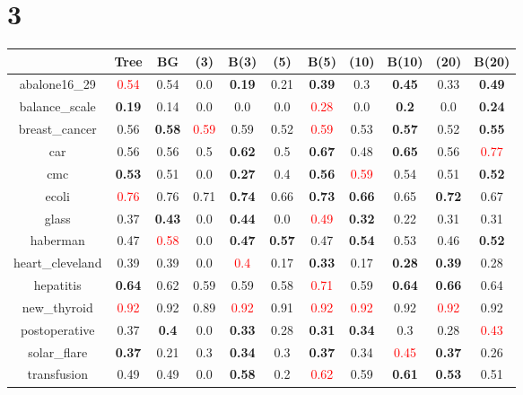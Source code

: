 \documentclass{article}%
\begin{document}
\section*{3}%
\begin{tabular}{c|cccccccccc}%
\hline%
&Tree&BG&(3)&B(3)&(5)&B(5)&(10)&B(10)&(20)&B(20)\\%
\hline%
abalone16\_29&\textcolor{red}{ 
0.54
}&0.54&0.0&\textbf{0.19}&0.21&\textbf{0.39}&0.3&\textbf{0.45}&0.33&\textbf{0.49}\\%
\hline%
balance\_scale&\textbf{0.19}&0.14&0.0&0.0&0.0&\textcolor{red}{ 
0.28
}&0.0&\textbf{0.2}&0.0&\textbf{0.24}\\%
\hline%
breast\_cancer&0.56&\textbf{0.58}&\textcolor{red}{ 
0.59
}&0.59&0.52&\textcolor{red}{ 
0.59
}&0.53&\textbf{0.57}&0.52&\textbf{0.55}\\%
\hline%
car&0.56&0.56&0.5&\textbf{0.62}&0.5&\textbf{0.67}&0.48&\textbf{0.65}&0.56&\textcolor{red}{ 
0.77
}\\%
\hline%
cmc&\textbf{0.53}&0.51&0.0&\textbf{0.27}&0.4&\textbf{0.56}&\textcolor{red}{ 
0.59
}&0.54&0.51&\textbf{0.52}\\%
\hline%
ecoli&\textcolor{red}{ 
0.76
}&0.76&0.71&\textbf{0.74}&0.66&\textbf{0.73}&\textbf{0.66}&0.65&\textbf{0.72}&0.67\\%
\hline%
glass&0.37&\textbf{0.43}&0.0&\textbf{0.44}&0.0&\textcolor{red}{ 
0.49
}&\textbf{0.32}&0.22&0.31&0.31\\%
\hline%
haberman&0.47&\textcolor{red}{ 
0.58
}&0.0&\textbf{0.47}&\textbf{0.57}&0.47&\textbf{0.54}&0.53&0.46&\textbf{0.52}\\%
\hline%
heart\_cleveland&0.39&0.39&0.0&\textcolor{red}{ 
0.4
}&0.17&\textbf{0.33}&0.17&\textbf{0.28}&\textbf{0.39}&0.28\\%
\hline%
hepatitis&\textbf{0.64}&0.62&0.59&0.59&0.58&\textcolor{red}{ 
0.71
}&0.59&\textbf{0.64}&\textbf{0.66}&0.64\\%
\hline%
new\_thyroid&\textcolor{red}{ 
0.92
}&0.92&0.89&\textcolor{red}{ 
0.92
}&0.91&\textcolor{red}{ 
0.92
}&\textcolor{red}{ 
0.92
}&0.92&\textcolor{red}{ 
0.92
}&0.92\\%
\hline%
postoperative&0.37&\textbf{0.4}&0.0&\textbf{0.33}&0.28&\textbf{0.31}&\textbf{0.34}&0.3&0.28&\textcolor{red}{ 
0.43
}\\%
\hline%
solar\_flare&\textbf{0.37}&0.21&0.3&\textbf{0.34}&0.3&\textbf{0.37}&0.34&\textcolor{red}{ 
0.45
}&\textbf{0.37}&0.26\\%
\hline%
transfusion&0.49&0.49&0.0&\textbf{0.58}&0.2&\textcolor{red}{ 
0.62
}&0.59&\textbf{0.61}&\textbf{0.53}&0.51\\%

\end{tabular}
\end{document}
